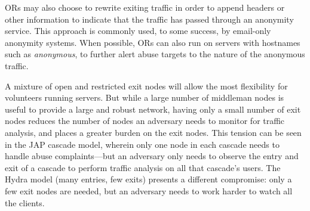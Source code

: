 \documentclass[times,10pt,twocolumn]{article}
\begin{document}
ORs may also choose to rewrite exiting traffic in order to append
headers or other information to indicate that the traffic has passed
through an anonymity service.  This approach is commonly used, to some
success, by email-only anonymity systems.  When possible, ORs can also
run on servers with hostnames such as {\it anonymous}, to further
alert abuse targets to the nature of the anonymous traffic.



A mixture of open and restricted exit nodes will allow the most
flexibility for volunteers running servers. But while a large number
of middleman nodes is useful to provide a large and robust network,
having only a small number of exit nodes reduces the number of nodes
an adversary needs to monitor for traffic analysis, and places a
greater burden on the exit nodes.  This tension can be seen in the JAP
cascade model, wherein only one node in each cascade needs to handle
abuse complaints---but an adversary only needs to observe the entry
and exit of a cascade to perform traffic analysis on all that
cascade's users.  The Hydra model (many entries, few exits) presents a
different compromise: only a few exit nodes are needed, but an
adversary needs to work harder to watch all the clients.
\end{document}
